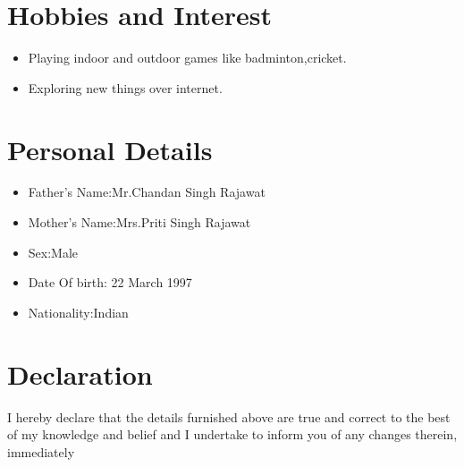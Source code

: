 \documentclass[11pt,a4paper]{article}
\begin{document}
\section*{Hobbies and Interest}
\vspace{-0.7em}\hline \vspace{1.5em}
\begin{itemize}
\item Playing indoor and outdoor games like badminton,cricket.
\item Exploring new things over internet.
\end{itemize}

\section*{Personal Details}
\vspace{-0.7em}\hline \vspace{1.5em}
\begin{itemize}
\item Father's Name:Mr.Chandan Singh Rajawat
\item Mother's Name:Mrs.Priti Singh Rajawat
\item Sex:Male
\item Date Of birth: 22 March 1997
\item Nationality:Indian
\end{itemize}

\section*{Declaration}
\vspace{-0.7em}\hline \vspace{1.5em}
I hereby declare that the details furnished above are true and correct to the best of my knowledge and belief and I undertake to inform you of any changes therein, immediately
\end{document}
